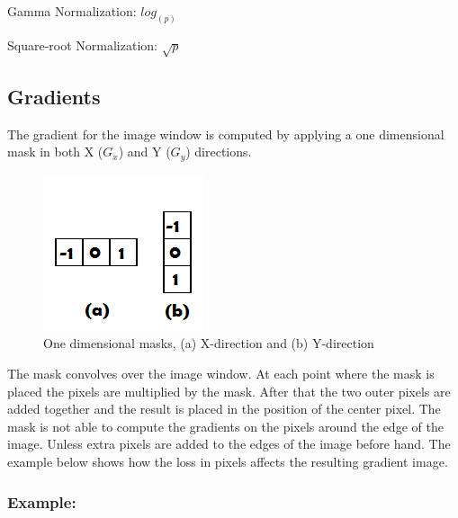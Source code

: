 Gamma Normalization: $log_(p)$ 

Square-root Normalization: $\sqrt{p}$

\subsection{Gradients}
The gradient for the image window is computed by applying a one dimensional mask in both X ($G_x$) and Y ($G_y$) directions.\

\begin{figure}[H]
  \centering
  \includegraphics[scale=1.0]{sobel}
  \caption{One dimensional masks, (a) X-direction and (b) Y-direction}
\end{figure}
\begin{flushleft}
The mask convolves over the image window. At each point where the mask is placed the pixels are multiplied by the mask. After that the two outer pixels are added together and the result is placed in the position of the center pixel. The mask is not able to compute the gradients on the pixels around the edge of the image. Unless extra pixels are added to the edges of the image before hand. The example below shows how the loss in pixels affects the resulting gradient image.
\end{flushleft}
\subsubsection{Example:}

